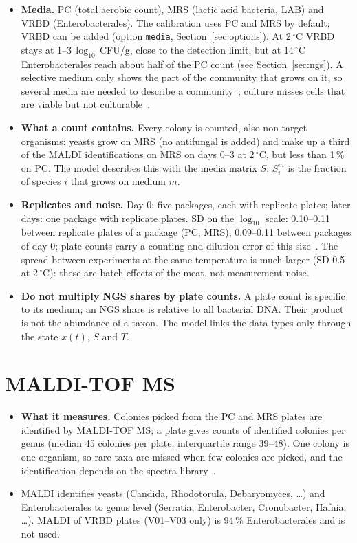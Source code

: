 \documentclass[11pt,a4paper]{article}
\newcommand{\code}[1]{\texttt{#1}}
\begin{document}
\begin{itemize}
\item \textbf{Media.} PC (total aerobic count), MRS (lactic acid bacteria, LAB) and VRBD (Enterobacterales). The calibration uses PC and MRS by default; VRBD can be added (option \code{media}, Section~\ref{sec:options}). At 2\,$^\circ$C VRBD stays at 1--3\,$\log_{10}$\,CFU/g, close to the detection limit, but at 14\,$^\circ$C Enterobacterales reach about half of the PC count (see Section~\ref{sec:ngs}). A selective medium only shows the part of the community that grows on it, so several media are needed to describe a community~\cite{balestra_increasing_1997}; culture misses cells that are viable but not culturable~\cite{kell_viability_1998, lagier_current_2015}.
\item \textbf{What a count contains.} Every colony is counted, also non-target organisms: yeasts grow on MRS (no antifungal is added) and make up a third of the MALDI identifications on MRS on days 0--3 at 2\,$^\circ$C, but less than 1\,\% on PC. The model describes this with the media matrix $S$: $S^m_i$ is the fraction of species $i$ that grows on medium $m$.
\item \textbf{Replicates and noise.} Day 0: five packages, each with replicate plates; later days: one package with replicate plates. SD on the $\log_{10}$ scale: 0.10--0.11 between replicate plates of a package (PC, MRS), 0.09--0.11 between packages of day 0; plate counts carry a counting and dilution error of this size~\cite{sutton2011accuracy}. The spread between experiments at the same temperature is much larger (SD 0.5 at 2\,$^\circ$C): these are batch effects of the meat, not measurement noise.
\item \textbf{Do not multiply NGS shares by plate counts.} A plate count is specific to its medium; an NGS share is relative to all bacterial DNA. Their product is not the abundance of a taxon. The model links the data types only through the state $x(t)$, $S$ and $T$.
\end{itemize}

\section{MALDI-TOF MS}

\begin{itemize}
\item \textbf{What it measures.} Colonies picked from the PC and MRS plates are identified by MALDI-TOF MS; a plate gives counts of identified colonies per genus (median 45 colonies per plate, interquartile range 39--48). One colony is one organism, so rare taxa are missed when few colonies are picked, and the identification depends on the spectra library~\cite{patel_maldi-tof_2015}.
\item MALDI identifies yeasts (Candida, Rhodotorula, Debaryomyces, \dots) and Enterobacterales to genus level (Serratia, Enterobacter, Cronobacter, Hafnia, \dots). MALDI of VRBD plates (V01--V03 only) is 94\,\% Enterobacterales and is not used.
\end{itemize}
\end{document}
